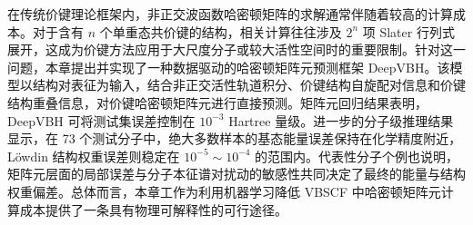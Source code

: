 在传统价键理论框架内，非正交波函数哈密顿矩阵的求解通常伴随着较高的计算成本。对于含有 $n$ 个单重态共价键的结构，相关计算往往涉及 $2^n$ 项 Slater 行列式展开，这成为价键方法应用于大尺度分子或较大活性空间时的重要限制\cite{shaik2008,chen2013nbodyi}。针对这一问题，本章提出并实现了一种数据驱动的哈密顿矩阵元预测框架 DeepVBH。该模型以结构对表征为输入，结合非正交活性轨道积分、价键结构自旋配对信息和价键结构重叠信息，对价键哈密顿矩阵元进行直接预测。矩阵元回归结果表明，DeepVBH 可将测试集误差控制在 $10^{-3}$ Hartree 量级。进一步的分子级推理结果显示，在 73 个测试分子中，绝大多数样本的基态能量误差保持在化学精度附近，Löwdin 结构权重误差则稳定在 $10^{-5}\sim10^{-4}$ 的范围内。代表性分子个例也说明，矩阵元层面的局部误差与分子本征谱对扰动的敏感性共同决定了最终的能量与结构权重偏差。总体而言，本章工作为利用机器学习降低 VBSCF 中哈密顿矩阵元计算成本提供了一条具有物理可解释性的可行途径。

\chapterreferences
